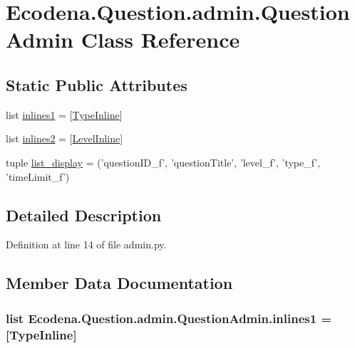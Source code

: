 \hypertarget{class_ecodena_1_1_question_1_1admin_1_1_question_admin}{
\section{Ecodena.Question.admin.QuestionAdmin Class Reference}
\label{de/dbf/class_ecodena_1_1_question_1_1admin_1_1_question_admin}
}
\subsection*{Static Public Attributes}
\begin{DoxyCompactItemize}
\item 
list \hyperlink{class_ecodena_1_1_question_1_1admin_1_1_question_admin_abf4ff55fb8b711b8f72c994057b4f079}{inlines1} = \mbox{[}\hyperlink{class_ecodena_1_1_question_1_1admin_1_1_type_inline}{TypeInline}\mbox{]}
\item 
list \hyperlink{class_ecodena_1_1_question_1_1admin_1_1_question_admin_af415e6770a6fddb17ccec6bbeb21c957}{inlines2} = \mbox{[}\hyperlink{class_ecodena_1_1_question_1_1admin_1_1_level_inline}{LevelInline}\mbox{]}
\item 
tuple \hyperlink{class_ecodena_1_1_question_1_1admin_1_1_question_admin_a2c455e376dbf6d80c30f869216829c02}{list\_\-display} = ('questionID\_\-f', 'questionTitle', 'level\_\-f', 'type\_\-f', 'timeLimit\_\-f')
\end{DoxyCompactItemize}


\subsection{Detailed Description}


Definition at line 14 of file admin.py.



\subsection{Member Data Documentation}
\hypertarget{class_ecodena_1_1_question_1_1admin_1_1_question_admin_abf4ff55fb8b711b8f72c994057b4f079}{
\subsubsection[{inlines1}]{\setlength{\rightskip}{0pt plus 5cm}list {\bf Ecodena.Question.admin.QuestionAdmin.inlines1} = \mbox{[}{\bf TypeInline}\mbox{]}}}
\label{de/dbf/class_ecodena_1_1_question_1_1admin_1_1_question_admin_abf4ff55fb8b711b8f72c994057b4f079}


